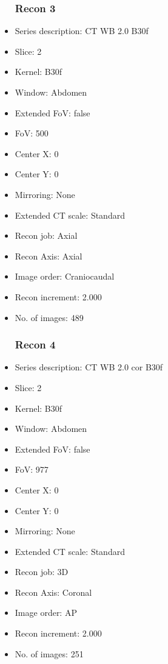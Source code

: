 \documentclass[12pt]{article}
\begin{document}
\begin{itemize}
\subsubsection{Recon 3}
\item Series description: CT WB 2.0 B30f
\item Slice: 2
\item Kernel: B30f
\item Window: Abdomen
\item Extended FoV: false
\item FoV: 500
\item Center X: 0
\item Center Y: 0
\item Mirroring: None
\item Extended CT scale: Standard
\item Recon job: Axial
\item Recon Axis: Axial
\item Image order: Craniocaudal
\item Recon increment: 2.000
\item No. of images: 489
\subsubsection{Recon 4}
\item Series description: CT WB 2.0 cor B30f
\item Slice: 2
\item Kernel: B30f
\item Window: Abdomen
\item Extended FoV: false
\item FoV: 977
\item Center X: 0
\item Center Y: 0
\item Mirroring: None
\item Extended CT scale: Standard
\item Recon job: 3D
\item Recon Axis: Coronal
\item Image order: AP
\item Recon increment: 2.000
\item No. of images: 251

\end{itemize}
\end{document}
